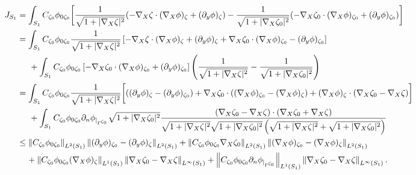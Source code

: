 \documentclass[11pt]{article}
\begin{document}
\begin{equation*}
	\begin{split}
		J_{S_1}&=\displaystyle\int_{S_1}C_{\zeta_0}\phi_{0\zeta_0}\bigg[\frac{1}{\sqrt{1+|\nabla_X\zeta|^2}}(-\nabla_X\zeta\cdot(\nabla_X\phi)_{\zeta}+(\partial_y\phi)_{\zeta}) -\frac{1}{\sqrt{1+|\nabla_X\zeta_0|^2}}(-\nabla_X\zeta_0\cdot(\nabla_X\phi)_{\zeta_0}+(\partial_y\phi)_{\zeta_0})     \bigg]\\
		&=\displaystyle\int_{S_1}C_{\zeta_0}\phi_{0\zeta_0}\frac{1}{\sqrt{1+|\nabla_X\zeta|^2}}\left[-\nabla_X\zeta\cdot(\nabla_X\phi)_{\zeta}+(\partial_y\phi)_{\zeta}+\nabla_X\zeta_0\cdot(\nabla_X\phi)_{\zeta_0}-(\partial_y\phi)_{\zeta_0}
		\right]\\
		&\hspace{0.5cm}+\displaystyle\int_{S_1}C_{\zeta_0}\phi_{0\zeta_0}\left[-\nabla_X\zeta_0\cdot(\nabla_X\phi)_{\zeta_0}+(\partial_y\phi)_{\zeta_0}\right]\left(\frac{1}{\sqrt{1+|\nabla_X\zeta|^2}} -\frac{1}{\sqrt{1+|\nabla_X\zeta_0|^2}}\right)
		\\
		&=\displaystyle\int_{S_1}C_{\zeta_0}\phi_{0\zeta_0}\frac{1}{\sqrt{1+|\nabla_X\zeta|^2}}\bigg[((\partial_y\phi)_{\zeta}-(\partial_y\phi)_{\zeta_0})+\nabla_X\zeta_0\cdot((\nabla_X\phi)_{\zeta_0}-(\nabla_X\phi)_{\zeta})+(\nabla_X\phi)_{\zeta}\cdot(\nabla_X\zeta_0-\nabla_X\zeta)\bigg]\\
		&\hspace{0.5cm}+\displaystyle\int_{S_1}C_{\zeta_0}\phi_{0\zeta_0}\partial_n\phi_{|_{\Gamma^{\zeta_0}}}\sqrt{1+|\nabla_X\zeta_0|^2}\dfrac{(\nabla_X\zeta_0-\nabla_X\zeta)\cdot(\nabla_X\zeta_0+\nabla_X\zeta)}{\sqrt{1+|\nabla_X\zeta|^2}\sqrt{1+|\nabla_X\zeta_0|^2}\left(\sqrt{1+|\nabla_X\zeta|^2}+\sqrt{1+|\nabla_X\zeta_0|^2}\right)}\\
		&\leq \left\Vert C_{\zeta_0}\phi_{0\zeta_0} \right\Vert_{L^2(S_1)}\left\Vert (\partial_y\phi)_{\zeta_0}-(\partial_y\phi)_{\zeta} \right\Vert_{L^2(S_1)}+\left\Vert C_{\zeta_0}\phi_{0\zeta_0} \nabla_X\zeta_0 \right\Vert_{L^2(S_1)} \left\Vert  (\nabla_X\phi)_{\zeta_0}-(\nabla_X\phi)_{\zeta}\right\Vert_{L^2(S_1)}\\
		&\hspace{0.4cm}+\left\Vert C_{\zeta_0} \phi_{0\zeta_0}(\nabla_X\phi)_{\zeta} \right\Vert_{L^1(S_1)}\left\Vert   \nabla_X\zeta_0-\nabla_X\zeta\right\Vert_{L^{\infty}(S_1)}+ \left\Vert C_{\zeta_0}\phi_{0\zeta_0}\partial_n\phi_{|_{\Gamma^{\zeta_0}}}  \right\Vert_{L^1(S_1)}\left\Vert\nabla_X\zeta_0-\nabla_X\zeta  \right\Vert_{L^{\infty}(S_1)}.\\
	\end{split}
\end{equation*}
\end{document}
